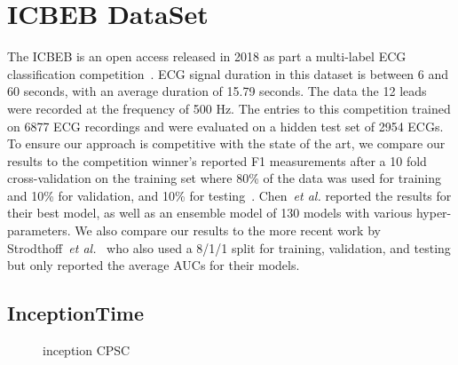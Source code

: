 \documentclass{article}
\begin{document}
\section{ICBEB DataSet}
The ICBEB is an open access  released in 2018 as part a multi-label ECG classification competition~\cite{liu2018open}. ECG signal duration in this dataset is between 6 and 60 seconds, with an average duration of 15.79 seconds. The data the 12 leads were recorded at the frequency of 500 Hz. The entries to this competition trained on 6877 ECG recordings and were evaluated on a hidden test set of 2954 ECGs. To ensure our approach is competitive with the state of the art, we compare our results to the competition winner's reported F1 measurements after a 10 fold cross-validation on the training set where 80\% of the data was used for training and 10\% for validation, and 10\% for testing~\cite{chen2020detection}. Chen~\textit{et al.} reported the results for their best model, as well as an ensemble model of 130 models with various hyper-parameters.
We also compare our results to the more recent work by Strodthoff~\textit{et al.}~\cite{Strodthoff2021} who also used a 8/1/1 split for training, validation, and testing but only reported the average AUCs for their models. 

\subsection{InceptionTime}
\begin{figure}[!htbp]

  \caption{inception CPSC}\label{fig:inception_cpsc}
\end{figure}
\end{document}

